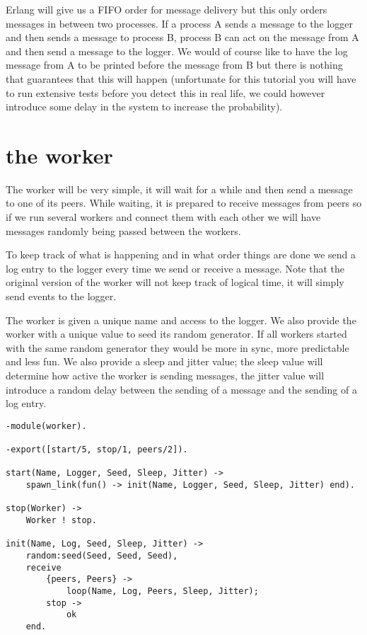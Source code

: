 \documentclass[a4paper, 11pt]{article}
\begin{document}
Erlang will give us a FIFO order for message delivery but this only
orders messages in between two processes. If a process A sends a
message to the logger and then sends a message to process B, process B
can act on the message from A and then send a message to the
logger. We would of course like to have the log message from A to be
printed before the message from B but there is nothing that guarantees
that this will happen (unfortunate for this tutorial you will have to
run extensive tests before you detect this in real life, we could
however introduce some delay in the system to increase the
probability).

\section{the worker}

The worker will be very simple, it will wait for a while and then send
a message to one of its peers. While waiting, it is prepared to receive
messages from peers so if we run several workers and connect them with
each other we will have messages randomly being passed between the workers.

To keep track of what is happening and in what order things are done
we send a log entry to the logger every time we send or receive a
message. Note that the original version of the worker will not keep
track of logical time, it will simply send events to the logger.

The worker is given a unique name and access to the logger. We also
provide the worker with a unique value to seed its random
generator. If all workers started with the same random generator they
would be more in sync, more predictable and less fun. We also provide
a sleep and jitter value; the sleep value will determine how active
the worker is sending messages, the jitter value will introduce a
random delay between the sending of a message and the sending of a log
entry.

\begin{verbatim}
-module(worker).

-export([start/5, stop/1, peers/2]).

start(Name, Logger, Seed, Sleep, Jitter) ->
    spawn_link(fun() -> init(Name, Logger, Seed, Sleep, Jitter) end).

stop(Worker) ->
    Worker ! stop.

init(Name, Log, Seed, Sleep, Jitter) ->
    random:seed(Seed, Seed, Seed),
    receive 
        {peers, Peers} ->
            loop(Name, Log, Peers, Sleep, Jitter);
        stop ->
            ok
    end.
\end{verbatim}
\end{document}
